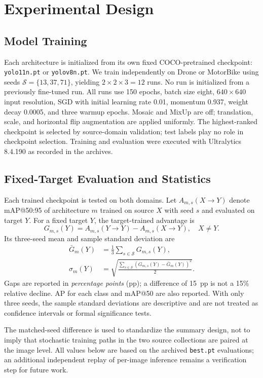 \documentclass[conference,a4paper]{IEEEtran}
\begin{document}
\section{Experimental Design}
\subsection{Model Training}
Each architecture is initialized from its own fixed COCO-pretrained checkpoint: \texttt{yolo11n.pt} or \texttt{yolov8n.pt}. We train independently on Drone or MotorBike using seeds $\mathcal{S}=\{13,37,71\}$, yielding $2\times2\times3=12$ runs. No run is initialized from a previously fine-tuned run. All runs use 150 epochs, batch size eight, $640\times640$ input resolution, SGD with initial learning rate 0.01, momentum 0.937, weight decay 0.0005, and three warmup epochs. Mosaic and MixUp are off; translation, scale, and horizontal flip augmentation are applied uniformly. The highest-ranked checkpoint is selected by source-domain validation; test labels play no role in checkpoint selection. Training and evaluation were executed with Ultralytics 8.4.190 as recorded in the archives.

\subsection{Fixed-Target Evaluation and Statistics}
Each trained checkpoint is tested on both domains. Let $A_{m,s}(X\!\rightarrow\!Y)$ denote mAP@50:95 of architecture $m$ trained on source $X$ with seed $s$ and evaluated on target $Y$. For a fixed target $Y$, the target-trained advantage is
\begin{equation}
G_{m,s}(Y)=A_{m,s}(Y\!\rightarrow\!Y)-A_{m,s}(X\!\rightarrow\!Y),\quad X\ne Y.
\label{eq:gap}
\end{equation}
Its three-seed mean and sample standard deviation are
\begin{align}
\bar{G}_m(Y)&=\frac{1}{3}\sum_{s\in\mathcal S}G_{m,s}(Y), \\[-2pt]
\sigma_m(Y)&=\sqrt{\frac{\sum_{s\in\mathcal S}(G_{m,s}(Y)-\bar G_m(Y))^2}{2}}.
\label{eq:std}
\end{align}
Gaps are reported in \emph{percentage points} (pp); a difference of 15~pp is not a 15\% relative decline. AP for each class and mAP@50 are also reported. With only three seeds, the sample standard deviations are descriptive and are not treated as confidence intervals or formal significance tests.

The matched-seed difference is used to standardize the summary design, not to imply that stochastic training paths in the two source collections are paired at the image level. All values below are based on the archived \texttt{best.pt} evaluations; an additional independent replay of per-image inference remains a verification step for future work.
\end{document}
